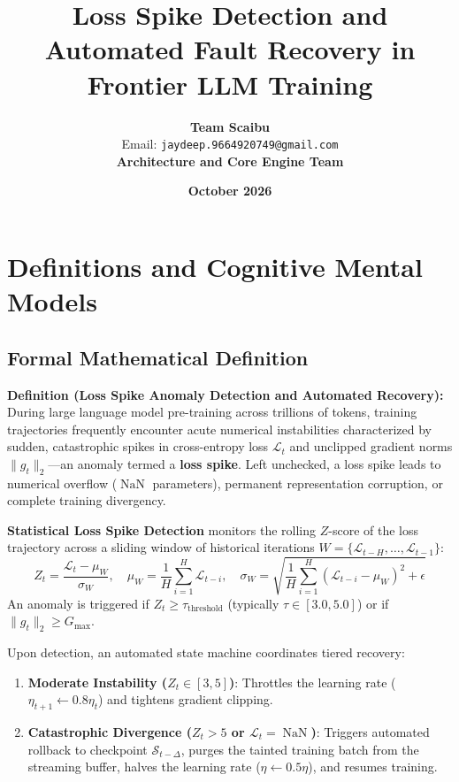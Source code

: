 \documentclass[11pt,a4paper]{article}
\title{\textbf{Loss Spike Detection and Automated Fault Recovery in Frontier LLM Training}}
\author{\textbf{Team Scaibu} \\ \small Email: \texttt{jaydeep.9664920749@gmail.com} \\ \small \textbf{Architecture and Core Engine Team}}
\date{\textbf{October 2026}}
\theoremstyle{definition}
\begin{document}
\maketitle

\section{Definitions and Cognitive Mental Models}

\subsection{Formal Mathematical Definition}
\textbf{Definition (Loss Spike Anomaly Detection and Automated Recovery):}
During large language model pre-training across trillions of tokens, training trajectories frequently encounter acute numerical instabilities characterized by sudden, catastrophic spikes in cross-entropy loss $\mathcal{L}_t$ and unclipped gradient norms $\|g_t\|_2$—an anomaly termed a \textbf{loss spike}. Left unchecked, a loss spike leads to numerical overflow ($\operatorname{NaN}$ parameters), permanent representation corruption, or complete training divergency.

\textbf{Statistical Loss Spike Detection} monitors the rolling $Z$-score of the loss trajectory across a sliding window of historical iterations $W = \{\mathcal{L}_{t-H}, \dots, \mathcal{L}_{t-1}\}$:
{\boldmath
\begin{equation}
Z_t = \frac{\mathcal{L}_t - \mu_W}{\sigma_W}, \quad \mu_W = \frac{1}{H} \sum_{i=1}^H \mathcal{L}_{t-i}, \quad \sigma_W = \sqrt{\frac{1}{H} \sum_{i=1}^H (\mathcal{L}_{t-i} - \mu_W)^2 + \epsilon}
\end{equation}
}
An anomaly is triggered if $Z_t \ge \tau_{\text{threshold}}$ (typically $\tau \in [3.0, 5.0]$) or if $\|g_t\|_2 \ge G_{\max}$.

Upon detection, an automated state machine coordinates tiered recovery:
\begin{enumerate}
    \item \textbf{Moderate Instability ($Z_t \in [3, 5]$)}: Throttles the learning rate ($\eta_{t+1} \gets 0.8 \eta_t$) and tightens gradient clipping.
    \item \textbf{Catastrophic Divergence ($Z_t > 5$ or $\mathcal{L}_t = \operatorname{NaN}$)}: Triggers automated rollback to checkpoint $\mathcal{S}_{t - \Delta}$, purges the tainted training batch from the streaming buffer, halves the learning rate ($\eta \gets 0.5 \eta$), and resumes training.
\end{enumerate}
\end{document}
